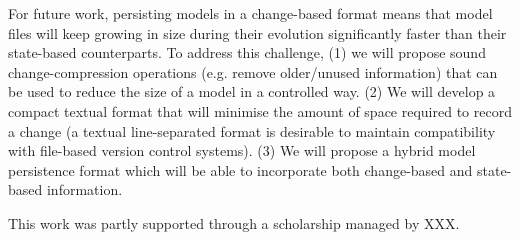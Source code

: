 \documentclass[sigconf]{acmart}
\begin{document}
For future work, persisting models in a change-based format means that model files will keep growing in size during their evolution significantly faster than their state-based counterparts. To address this challenge, (1) we will propose sound change-compression operations (e.g. remove older/unused information) that can be used to reduce the size of a model in a controlled way. (2) We will develop a compact textual format that will minimise the amount of space required to record a change (a textual line-separated format is desirable to maintain compatibility with file-based version control systems). (3) We will propose a hybrid model persistence format which will be able to incorporate both change-based and state-based information. 


\begin{acks}
This work was partly supported through a scholarship managed by XXX. %
\end{acks}



 
\end{document}
